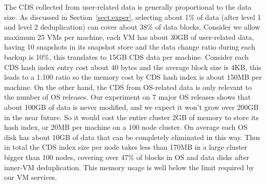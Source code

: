 The CDS collected from user-related data is generally proportional to the data size.
As discussed in Section~\ref{sect:exper}, selecting about 1\% of data (after level 1 and level 2 deduplication)
can cover about 38\% of data blocks. Consider we allow maximum 25 VMs per machine, each VM has
about 30GB of user-related data, having 10 snapshots in its snapshot store and the data change ratio during
each backup is 10\%, this translates to 15GB CDS data per machine. 
Consider each CDS hash index entry cost about 40 bytes and the average block size is 4KB, this leads to
a 1:100 ratio so the 
memory cost by CDS hash index is about 150MB per machine.
On the other hand, the CDS from OS-related data is only relevant to the number of OS releases.
Our experiment on 7 major OS releases shows that about 100GB of data is never modified, and we expect
it won't grow over 200GB in the near future. So it would cost the entire cluster 2GB of memory to
store its hash index, or 20MB per machine on a 100 node cluster. On average each OS disk has about 10GB
of data that can be completely eliminated in this way.
Thus in total the CDS index size per node takes less than 170MB in a large cluster bigger than 100 nodes, 
covering over 47\% of blocks in OS and data disks after inner-VM deduplication.
This memory usage is well below the limit required by our VM services.


